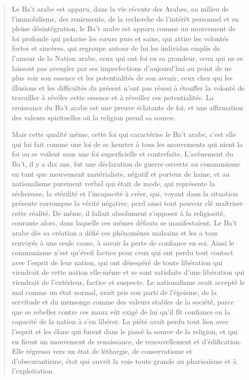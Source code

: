 \begin{quote}




Le Ba't arabe est apparu, dans la vie récente des Arabes, au milieu de
l'immobilisme, des reniements, de la recherche de l'intérêt personnel et
en pleine désintégration, le Ba't arabe est apparu comme un mouvement de
foi profonde qui polarise les cœurs purs et sains, qui attire les
volontés fortes et sincères, qui regroupe autour de lui les individus
emplis de l'amour de la Nation arabe, ceux qui ont foi en sa grandeur,
ceux qui ne se laissent pas aveugler par ses imperfections d'aujourd'hui
au point de ne plus voir son essence et les potentialités de son avenir,
ceux chez qui les illusions et les difficultés du présent n'ont pas
réussi à étouffer la volonté de travailler à révéler cette essence et à
réveiller ces potentialités. La croissance du Ba't arabe est une preuve
éclatante de foi, et une affirmation des valeurs spirituelles où la
religion prend sa source.

Mais cette qualité même, cette foi qui caractérise le Ba't arabe, c'est
elle qui lui fait comme une loi de se heurter à tous les mouvements qui
nient la foi ou se voilent sous une foi superficielle et contrefaite.
L'avènement du Ba't, il y a dix ans, fut une déclaration de guerre
ouverte au communisme en tant que mouvement matérialiste, négatif et
porteur de haine, et au nationalisme purement verbal qui était de mode,
qui représente la sécheresse, la stérilité et l'incapacité à créer, qui,
voyant dans la situation présente corrompue la vérité négative, perd
ainsi tout pouvoir clé maîtriser cette réalité. De même, il fallait
absolument s'opposer à la religiosité, courante alors, dans laquelle ces
mêmes défauts
se manifestaient. Le Ba't arabe dès sa création a défié ces phénomènes
malsains et les a tous renvoyés à une seule cause, à savoir la perte de
confiance en soi. Ainsi le communisme n'est qu'éveil factice pour ceux
qui ont perdu tout contact avec l'esprit de leur nation, qui ont
désespéré de toute libération qui viendrait de cette nation elle-même et
se sont satisfaits d'une libération qui viendrait de l'extérieur,
factice et suspecte. Le nationalisme avait accepté le mal comme un état
normal, avait pris son parti de l'égoïsme, de la servitude et du
mensonge comme des valeurs stables de la société, parce que se rebeller
contre ces maux eût exigé de lui qu'il fît confiance en la capacité de
la nation à s'en libérer. La piété avait perdu tout lien avec l'esprit
et les élans qui furent dans le passé la source de la religion, et qui
en firent un mouvement de renaissance, de renouvellement et
d'édification. Elle régressa vers un état de léthargie, de conservatisme
et d'obscurantisme, état qui ouvrit la voie toute grande au pharisaïsme
et à l'exploitation.


\end{quote}
